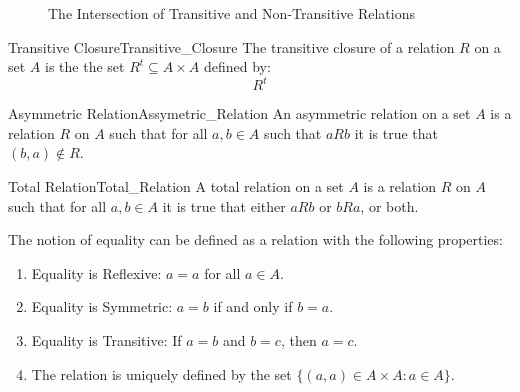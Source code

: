     \begin{figure}[H]
        \centering
        \captionsetup{type=figure}
        \begin{subfigure}[b]{0.49\textwidth}
            \centering
            
            \label{fig:Trans_Intersect_Non_Trans_May_Not_Be_Trans}
        \end{subfigure}
        \hfill
        \begin{subfigure}[b]{0.49\textwidth}
            \centering
            
            \label{fig:Trans_Int_Trans_May_Not_Be_Trans}
        \end{subfigure}
        \label{fig:Intersection_of_Transitive_and_Non_Transitive_Relations}
        \caption{The Intersection of Transitive and Non-Transitive Relations}
    \end{figure}
    \begin{fdefinition}{Transitive Closure}{Transitive_Closure}
        The transitive closure of a relation $R$ on a set
        $A$ is the the set $R^{t}\subseteq{A}\times{A}$ defined by:
        \begin{equation}
            R^{t}
        \end{equation}
    \end{fdefinition}
    \begin{fdefinition}{Asymmetric Relation}{Assymetric_Relation}
        An asymmetric relation on a set $A$ is a relation $R$
        on $A$ such that for all $a,b\in{A}$ such that $aRb$
        it is true that $(b,a)\notin{R}$.
    \end{fdefinition}
    \begin{fdefinition}{Total Relation}{Total_Relation}
        A total relation on a set $A$ is a relation $R$ on $A$ such
        that for all $a,b\in{A}$ it is true that either
        $aRb$ or $bRa$, or both.
    \end{fdefinition}
    The notion of equality can be defined as a relation
    with the following properties:
    \begin{enumerate}
        \item Equality is Reflexive: $a=a$ for all $a\in{A}$.
        \item Equality is Symmetric: $a=b$ if and only if $b=a$.
        \item Equality is Transitive: If $a=b$ and $b=c$, then $a=c$.
        \item The relation is uniquely defined by the set
              $\{(a,a)\in A\times A:a\in A\}$.
    \end{enumerate}
